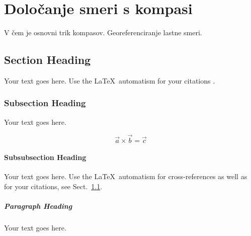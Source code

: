 %
\chapter{Določanje smeri s kompasi}
\label{intro} %

V čem je osnovni trik kompasov. Georeferenciranje lastne smeri.

\section{Section Heading}
\label{sec:1}
Your text goes here. Use the \LaTeX\ automatism for your citations
\cite{monograph}.

\subsection{Subsection Heading}
\label{sec:2}
Your text goes here.

\begin{equation}
	\vec{a}\times\vec{b}=\vec{c}
\end{equation}

\subsubsection{Subsubsection Heading}
Your text goes here. Use the \LaTeX\ automatism for cross-references as
well as for your citations, see Sect.~\ref{sec:1}.

\paragraph{Paragraph Heading} %
Your text goes here.

